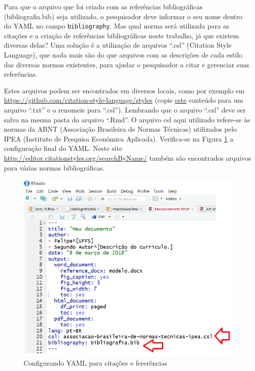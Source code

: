 \documentclass[12pt,brazil,oneside]{book}
\begin{document}
Para que o arquivo que foi criado com as referências bibliográficas
(bibliografia.bib) seja utilizado, o pesquisador deve informar o seu
nome dentro do YAML no campo \texttt{bibliography}. Mas qual norma será
utilizada para as citações e a criação de referências bibliográficas
neste trabalho, já que existem diversas delas? Uma solução é a
utilização de arquivos ``.csl'' (Citation Style Language), que nada mais
são do que arquivos com as descrições de cada estilo das diversas normas
existentes, para ajudar o pesquisador a citar e gerenciar suas
referências.

Estes arquivos podem ser encontrados em diversos locais, como por
exemplo em \url{https://github.com/citation-style-language/styles}
(copie
\href{https://raw.githubusercontent.com/citation-style-language/styles/44808db510152943c5d9dc471a9c8982a3edfbea/associacao-brasileira-de-normas-tecnicas-ipea.csl}{este}
conteúdo para um arquivo ``.txt'' e o renomeie para ``.csl''). Lembrando
que o arquivo ``.csl'' deve ser salvo na mesma pasta do arquivo
``.Rmd''. O arquivo csl aqui utilizado refere-se às normas da ABNT
(Associação Brasileira de Normas Técnicas) utilizados pelo IPEA
(Instituto de Pesquisa Econômica Aplicada). Verifica-se na Figura
\ref{fig:rmarkcitar1} a configuração final do YAML. Neste site
\url{http://editor.citationstyles.org/searchByName/} também são
encontrados arquivos para várias normas bibliográficas.

\begin{figure}[H]

{\centering \includegraphics[width=0.8\linewidth]{rmarkcitar1} 

}

\caption{Configurando YAML para citações e fererências}\label{fig:rmarkcitar1}
\end{figure}
\end{document}
